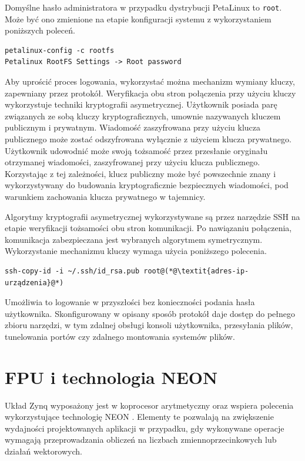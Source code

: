 Domyślne hasło administratora w przypadku dystrybucji PetaLinux to \texttt{root}. 
Może być ono zmienione na etapie konfiguracji systemu z wykorzystaniem poniższych poleceń. %

\begin{lstlisting}[breaklines=true]
petalinux-config -c rootfs
Petalinux RootFS Settings -> Root password
\end{lstlisting}

Aby uprościć proces logowania, wykorzystać można mechanizm wymiany kluczy, zapewniany przez protokół. Weryfikacja obu stron połączenia przy użyciu kluczy wykorzystuje techniki kryptografii asymetrycznej. Użytkownik posiada parę związanych ze sobą kluczy kryptograficznych, umownie nazywanych kluczem publicznym i prywatnym. Wiadomość zaszyfrowana przy użyciu klucza publicznego może zostać odszyfrowana wyłącznie z użyciem klucza prywatnego. Użytkownik udowodnić może swoją tożsamość przez przesłanie oryginału otrzymanej wiadomości, zaszyfrowanej przy użyciu klucza publicznego.
Korzystając z tej zależności, klucz publiczny może być powszechnie znany i wykorzystywany do budowania kryptograficznie bezpiecznych wiadomości, pod warunkiem zachowania klucza prywatnego w tajemnicy.

Algorytmy kryptografii asymetrycznej wykorzystywane są przez narzędzie SSH na etapie weryfikacji tożsamości obu stron komunikacji. Po nawiązaniu połączenia, komunikacja zabezpieczana jest wybranych algorytmem symetrycznym. Wykorzystanie mechanizmu kluczy wymaga użycia poniższego polecenia.

\begin{lstlisting}[breaklines=true]
ssh-copy-id -i ~/.ssh/id_rsa.pub root@(*@\textit{adres-ip-urządzenia}@*)
\end{lstlisting}

Umożliwia to logowanie w przyszłości bez konieczności podania hasła użytkownika. 
Skonfigurowany w opisany sposób protokół daje dostęp do pełnego zbioru narzędzi, w tym zdalnej obsługi konsoli użytkownika, przesyłania plików, tunelowania portów czy zdalnego montowania systemów plików.

\section{FPU i technologia NEON}

\label{sec:arm-neon}

Układ Zynq wyposażony jest w koprocesor arytmetyczny oraz wspiera polecenia wykorzystujące technologię NEON \cite{neon-home}. %
Elementy te pozwalają na zwiększenie wydajności projektowanych aplikacji w przypadku, gdy wykonywane operacje wymagają przeprowadzania obliczeń na liczbach zmiennoprzecinkowych lub działań wektorowych. 

